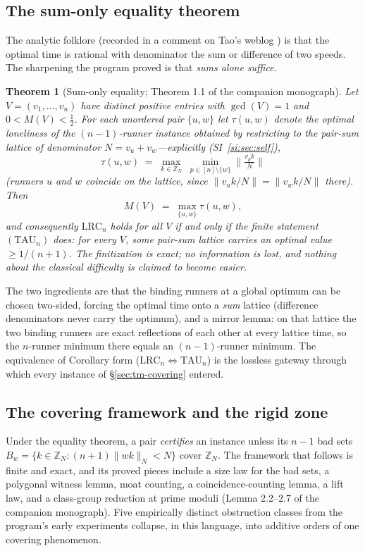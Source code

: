 \documentclass[11pt,a4paper]{article}
\numberwithin{equation}{section}
\theoremstyle{plain}
\newtheorem{theorem}{Theorem}[section]
\theoremstyle{definition}
\theoremstyle{remark}
\newcommand{\Z}{\mathbb{Z}}
\newcommand{\wn}[1]{\lVert #1 \rVert_{N}}
\newcommand{\wnc}[1]{\lVert #1 \rVert}
\newcommand{\lrc}{\mathrm{LRC}}
\newcommand{\taust}{\mathrm{TAU}}
\begin{document}
\subsection{The sum-only equality theorem}

The analytic folklore (recorded in a comment on Tao's weblog
\cite{Tao-blog}) is that the optimal time is rational with denominator
the sum or difference of two speeds. The sharpening the program proved
is that \emph{sums alone suffice}.

\begin{theorem}[Sum-only equality; Theorem 1.1 of the companion
monograph]\label{thm:equality}
Let $V=(v_1,\dots,v_n)$ have distinct positive entries with
$\gcd(V)=1$ and $0<M(V)<\tfrac12$. For each unordered pair $\{u,w\}$
let $\tau(u,w)$ denote the optimal loneliness of the $(n-1)$-runner
instance obtained by restricting to the pair-sum lattice of denominator
$N=v_u+v_w$---explicitly (SI~\ref{si:sec:self}),
\[
\tau(u,w)\;=\;\max_{k\in\Z_{N}}\;\min_{p\in[n]\setminus\{w\}}
\wnc{\tfrac{v_pk}{N}}
\]
(runners $u$ and $w$ coincide on the lattice, since
$\wnc{v_uk/N}=\wnc{v_wk/N}$ there). Then
\[
M(V)\;=\;\max_{\{u,w\}}\tau(u,w),
\]
and consequently $\lrc_n$ holds for all $V$ if and only if the finite
statement $(\taust_n)$ does: for every $V$, some pair-sum lattice
carries an optimal value $\ge 1/(n+1)$. The finitization is exact; no
information is lost, and nothing about the classical difficulty is
claimed to become easier.
\end{theorem}

The two ingredients are that the binding runners at a global optimum can
be chosen two-sided, forcing the optimal time onto a \emph{sum} lattice
(difference denominators never carry the optimum), and a mirror lemma:
on that lattice the two binding runners are exact reflections of each
other at every lattice time, so the $n$-runner minimum there equals an
$(n-1)$-runner minimum. The equivalence of Corollary form
($\lrc_n\iff\taust_n$) is the lossless gateway through which every
instance of \S\ref{sec:tm-covering} entered.

\subsection{The covering framework and the rigid zone}

Under the equality theorem, a pair \emph{certifies} an instance unless
its $n-1$ bad sets $B_w=\{k\in\Z_N:(n{+}1)\wn{wk}<N\}$ cover $\Z_N$.
The framework that follows is finite and exact, and its proved pieces
include a size law for the bad sets, a polygonal witness lemma, moat
counting, a coincidence-counting lemma, a lift law, and a class-group
reduction at prime moduli (Lemma 2.2--2.7 of the companion
monograph). Five empirically distinct obstruction classes from the
program's early experiments collapse, in this language, into additive
orders of one covering phenomenon.
\end{document}
